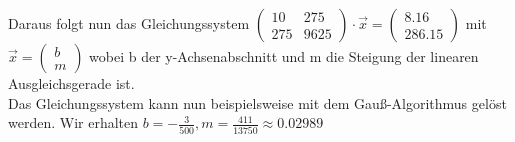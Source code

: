     \noindent Daraus folgt nun das Gleichungssystem 
    $\begin{pmatrix}
      10 & 275\\ 
      275 & 9625
    \end{pmatrix}
    \cdot \vec{x}
    = \begin{pmatrix}
      8.16\\ 
      286.15
    \end{pmatrix}$
    mit $\vec{x} = \begin{pmatrix}
      b\\ 
      m
    \end{pmatrix}$
    wobei b der y-Achsenabschnitt und m die Steigung der linearen Ausgleichsgerade ist.\\
    \noindent Das Gleichungssystem kann nun beispielsweise mit dem Gauß-Algorithmus gelöst werden. Wir erhalten $b = -\frac{3}{500}, m = \frac{411}{13750} \approx 0.02989$